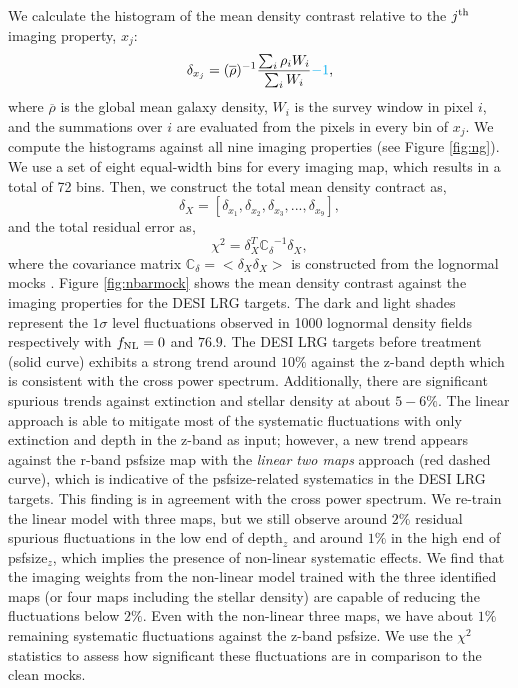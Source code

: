 We calculate the histogram of the mean density contrast relative to the $j^{\rm th}$ imaging property, $x_{j}$:
\begin{equation}
\delta_{x_{j}} = ({\overline{\rho}})^{-1} \frac{\sum_{i} \rho_{i} W_{i}}{\sum_{i} W_{i}} \textcolor{cyan}{- 1},
\end{equation}
where $\overline{\rho}$ is the global mean galaxy density, $W_{i}$ is the survey window in pixel $i$, and the summations over $i$ are evaluated from the pixels in every bin of $x_{j}$. We compute the histograms against all nine imaging properties (see Figure \ref{fig:ng}). We use a set of eight equal-width bins for every imaging map, which results in a total of 72 bins. Then, we construct the total mean density contract as,
\begin{equation}
\delta_{X} = [\delta_{x_{1}}, \delta_{x_{2}}, \delta_{x_{3}}, ..., \delta_{x_{9}}],
\end{equation}
and the total residual error as,
\begin{equation}
\chi^{2} = \delta_{X}^{T} \mathbb{C_{\delta}}^{-1} \delta_{X},
\end{equation}
where the covariance matrix $\mathbb{C}_{\delta} = < \delta_{X} \delta_{X}>$ is constructed from the lognormal mocks . Figure \ref{fig:nbarmock} shows the mean density contrast against the imaging properties for the DESI LRG targets. The dark and light shades represent the $1\sigma$ level fluctuations observed in 1000 lognormal density fields respectively with $f_{\rm NL}=0$ and $76.9$. The DESI LRG targets before treatment (solid curve) exhibits a strong trend around $10\%$ against the z-band depth which is consistent with the cross power spectrum. Additionally, there are significant spurious trends against extinction and stellar density at about $5-6\%$. The linear approach is able to mitigate most of the systematic fluctuations with only extinction and depth in the z-band as input; however, a new trend appears against the r-band psfsize map with the \textit{linear two maps} approach (red dashed curve), which is indicative of the psfsize-related systematics in the DESI LRG targets. This finding is in agreement with the cross power spectrum. We re-train the linear model with three maps, but we still observe around $2\%$ residual spurious fluctuations in the low end of depth$_{z}$ and around $1\%$ in the high end of psfsize$_{z}$, which implies the presence of non-linear systematic effects. We find that the imaging weights from the non-linear model trained with the three identified maps (or four maps including the stellar density) are capable of reducing the fluctuations below $2\%$. Even with the non-linear three maps, we have about $1\%$ remaining systematic fluctuations against the z-band psfsize. We use the $\chi^{2}$ statistics to assess how significant these fluctuations are in comparison to the clean mocks. 

